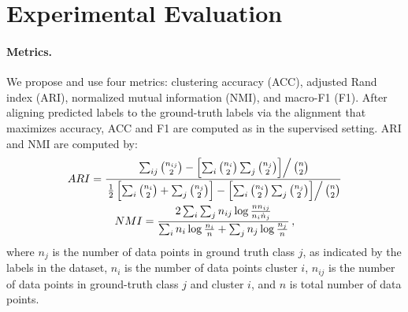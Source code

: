 \documentclass[wcp]{jmlr}
\begin{document}
\section{Experimental Evaluation} \label{sec:results}
\paragraph{Metrics.}
We propose and use four metrics: clustering accuracy (ACC), adjusted Rand index (ARI), normalized mutual information (NMI), and macro-F1 (F1). After aligning predicted labels to the ground-truth labels via the alignment that maximizes accuracy, ACC and F1 are computed as in the supervised setting. ARI and NMI are computed by:
\begin{gather*}
    ARI = \frac{ \left. \sum_{ij} \binom{n_{ij}}{2} - \left[\sum_i \binom{n_i}{2} \sum_j \binom{n_j}{2}\right] \right/ \binom{n}{2} }{ \left. \frac{1}{2} \left[\sum_i \binom{n_i}{2} + \sum_j \binom{n_j}{2}\right] - \left[\sum_i \binom{n_i}{2} \sum_j \binom{n_j}{2}\right] \right/ \binom{n}{2} } \\
    NMI = \frac{ 2 \sum_i \sum_j n_{ij} \log \frac{n n_{ij}}{n_i\dot n_j}}{\sum_i n_i \log \frac{n_i}{n} + \sum_j n_j \log \frac{n_j}{n}}\,,
\end{gather*}
where $n_j$ is the number of data points in ground truth class $j$, as indicated by the labels in the dataset, $n_i$ is the number of data points cluster $i$, $n_{ij}$ is the number of data points in ground-truth class $j$ and cluster $i$, and $n$ is total number of data points.
\end{document}
